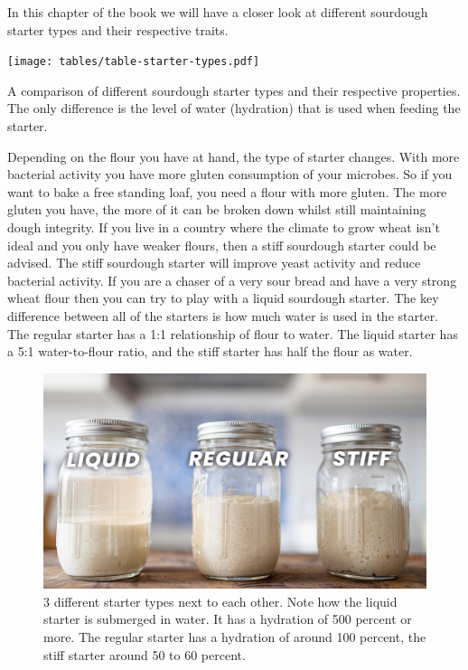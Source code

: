 In this chapter of the book we will have a closer look
at different sourdough starter types and their respective
traits.

\begin{table}[htp!]
  \texttt{[image: tables/table-starter-types.pdf]}
  \caption{A comparison of different sourdough starter types and their
  respective properties. The only difference is the level of water (hydration)
  that is used when feeding the starter.}
  \label{tab:starter-types-comparison}
\end{table}

Depending on the flour you have at hand, the type of starter changes. With more
bacterial activity you have more gluten consumption of your microbes. So if
you want to bake a free standing loaf, you need a flour with more gluten. The
more gluten you have, the more of it can be broken down whilst still maintaining
dough integrity. If you live in a country where the climate to grow wheat
isn't ideal and you only have weaker flours, then a stiff sourdough starter
could be advised. The stiff sourdough starter will improve yeast activity and
reduce bacterial activity. If you are a chaser of a very sour bread and have a
very strong wheat flour then you can try to play with a liquid sourdough
starter. The key difference between all of the starters is how much water
is used in the starter. The regular starter has a 1:1 relationship of flour
to water. The liquid starter has a 5:1 water-to-flour ratio, and the stiff
starter has half the flour as water.

\begin{figure}[!htb]
  \includegraphics[width=\textwidth]{sourdough-starter-types}
  \caption{3 different starter types next to each other. Note how the liquid starter is submerged
  in water. It has a hydration of 500 percent or more.
  The regular starter has a hydration of around 100 percent, the stiff starter around 50 to 60 percent.}
  \label{fig:starter-types}
\end{figure}


